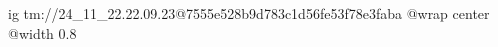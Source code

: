  
 
 
 
 

\qqSecOrig


\ifcmt
  ig tm://24_11_22.22.09.23@7555e528b9d783c1d56fe53f78e3faba
  @wrap center
  @width 0.8
\fi

